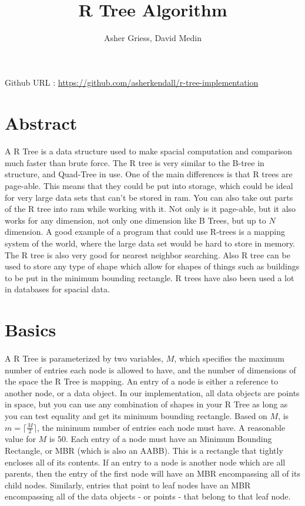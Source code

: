 \documentclass{article}
\author{Asher Griess, David Medin}
\title{R Tree Algorithm}
\begin{document}
\maketitle
\begin{center}
Github URL : \url{https://github.com/asherkendall/r-tree-implementation}
\end{center}

\begin{multicols}{2}[]
\section{Abstract}
\paragraph{}
A R Tree is a data structure used to make spacial computation and comparison much faster than brute force.
The R tree is very similar to the B-tree in structure, and Quad-Tree in use. One of the main differences is that
R trees are page-able. This means that they could be put into storage, which could be ideal for very large data sets 
that can't be stored in ram.  You can also take out parts of the R tree into ram while working with it. Not only is it page-able,
 but it also works for any dimension, not only one dimension like B Trees, but up to $N$ dimension. A good example
of a program that could use R-trees is a mapping system of the world, where the large data set would be hard to store in memory.
The R tree is also very good for nearest neighbor searching. Also R tree can be used to store any type of shape which allow for shapes
of things such as buildings to be put in the minimum bounding rectangle. R trees have also been used a lot in databases for spacial data.

\section{Basics}

\paragraph{}
A R Tree is parameterized by two variables, $M$, which specifies the maximum number of entries each node is allowed to have, and
 the number of dimensions of the space the R Tree is mapping. An entry of a node is either a reference
to another node, or a data object. In our implementation, all data objects are points in space, but you can use any combination
 of shapes in your R Tree as long as you can test equality and get its minimum bounding rectangle.
Based on $M$, is $m = \lceil\frac{M}{2}\rceil$, the minimum number of entries each node must have. A reasonable value for $M$ is 50.
 \cite{guttman_1984_rtrees} Each entry of a node must have an Minimum Bounding Rectangle,
or MBR (which is also an AABB). This is a rectangle that tightly encloses all of its contents. If an entry to a node is another node
which are all parents, then the entry of the first node will have an MBR encompassing all of its child nodes.
Similarly, entries that point to leaf nodes have an MBR encompassing all of the data objects - or points - that belong to that leaf node.


\end{multicols}
\end{document}
